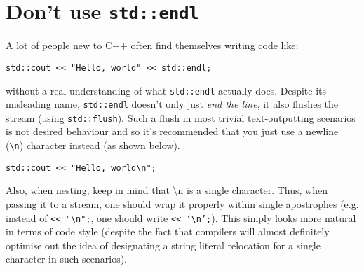 	\section{Don't use \texttt{std::endl}}

		A lot of people new to C++ often find themselves writing code like:

		\begin{verbatim}
std::cout << "Hello, world" << std::endl;
		\end{verbatim}

		without a real understanding of what \texttt{std::endl} actually does.
		Despite its misleading name, \texttt{std::endl} doesn't only just
		\textit{end the line}, it also flushes the stream (using
		\texttt{std::flush}). Such a flush in most trivial text-outputting
		scenarios is not desired behaviour and so it's recommended that you just
		use a newline (\texttt{\textbackslash n}) character instead (as shown
		below).

		\begin{verbatim}
std::cout << "Hello, world\n";
		\end{verbatim}

		Also, when nesting, keep in mind that \textbackslash n is a single
		character. Thus, when passing it to a stream, one should wrap it
		properly within single apostrophes (e.g. instead of \texttt{<<
		"\textbackslash n";}, one should write \texttt{<< `\textbackslash n';}).
		This simply looks more natural in terms of code style (despite the fact
		that compilers will almost definitely optimise out the idea of
		designating a string literal relocation for a single character in such
		scenarios). 
